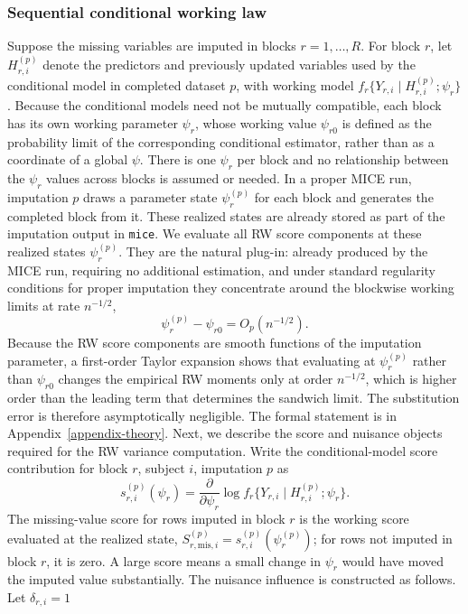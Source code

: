 \subsubsection{Sequential conditional working law}
Suppose the missing variables are imputed in blocks \(r=1,\ldots,R\).
For block \(r\), let \(H_{r,i}^{(p)}\) denote the predictors and
previously updated variables used by the conditional model in completed
dataset \(p\), with working model
\(f_r\{Y_{r,i}\mid H_{r,i}^{(p)};\psi_r\}\).
Because the conditional models need not be mutually compatible, each
block has its own working parameter \(\psi_r\), whose working value
\(\psi_{r0}\) is defined as the probability limit of the corresponding
conditional estimator, rather than as a coordinate of a global
\(\psi\).  There is one \(\psi_r\) per block and no relationship between
the \(\psi_r\) values across blocks is assumed or needed.
In a proper MICE run, imputation \(p\) draws a parameter state
\(\psi_r^{(p)}\) for each block and generates the completed block from
it.  These realized states are already stored as part of the imputation
output in \texttt{mice}.
We evaluate all RW score components at these realized states
\(\psi_r^{(p)}\).  They are the natural plug-in: already produced by the
MICE run, requiring no additional estimation, and under standard
regularity conditions for proper imputation they concentrate around the
blockwise working limits at rate \(n^{-1/2}\),
\[
\psi_r^{(p)}-\psi_{r0}=O_p(n^{-1/2}).
\]
Because the RW score components are smooth functions of the imputation
parameter, a first-order Taylor expansion shows that evaluating at
\(\psi_r^{(p)}\) rather than \(\psi_{r0}\) changes the empirical RW
moments only at order \(n^{-1/2}\), which is higher order than the
leading term that determines the sandwich limit.  The substitution error
is therefore asymptotically negligible.  The formal statement is in
Appendix~\ref{appendix-theory}.
Next, we describe the score and nuisance objects required for the RW
variance computation.  Write the conditional-model score contribution
for block \(r\), subject \(i\), imputation \(p\) as
\[
s_{r,i}^{(p)}(\psi_r)
=
\frac{\partial}{\partial\psi_r}
\log f_r\{Y_{r,i}\mid H_{r,i}^{(p)};\psi_r\}.
\]
The missing-value score for rows imputed in block \(r\) is the working
score evaluated at the realized state,
\(S_{r,\mathrm{mis},i}^{(p)}=s_{r,i}^{(p)}(\psi_r^{(p)})\); for rows
not imputed in block \(r\), it is zero.  A large score means a small
change in \(\psi_r\) would have moved the imputed value substantially.
The nuisance influence is constructed as follows.  Let \(\delta_{r,i}=1\)
